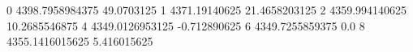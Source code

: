 0 4398.7958984375 49.0703125
1 4371.19140625 21.4658203125
2 4359.994140625 10.2685546875
4 4349.0126953125 -0.712890625
6 4349.7255859375 0.0
8 4355.1416015625 5.416015625
